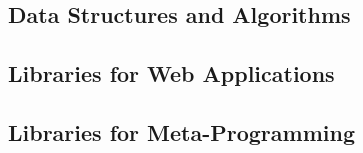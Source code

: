 \documentclass[11pt,fleqn]{article}
\begin{document}
{\subsection{Data Structures and Algorithms}












\subsection{Libraries for Web Applications}











\subsection{Libraries for Meta-Programming}













} %

\newpage



\newpage
\end{document}
